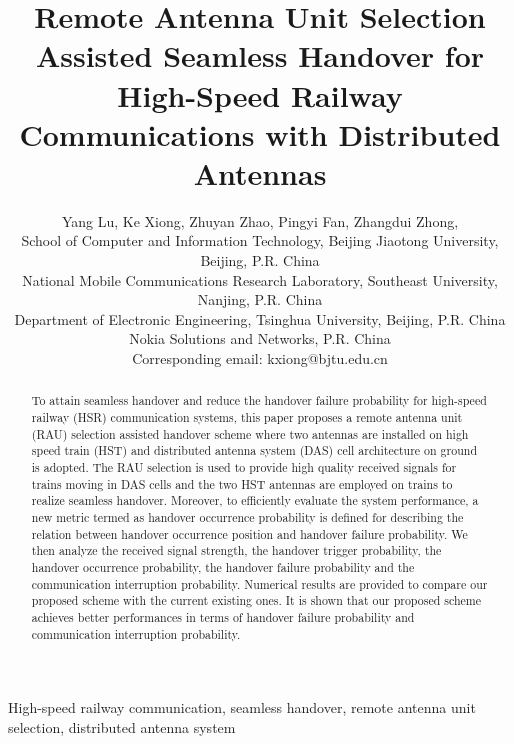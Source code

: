 \documentclass[a4paper,twocolumn,10pt]{IEEEtran}
\begin{document}
\title{Remote Antenna Unit Selection Assisted Seamless Handover for High-Speed Railway Communications with Distributed Antennas}

\author{Yang Lu, Ke Xiong, Zhuyan Zhao, Pingyi Fan, Zhangdui Zhong,
\\
\small
School of Computer and Information Technology, Beijing Jiaotong University, Beijing, P.R. China\\
National Mobile Communications
Research Laboratory, Southeast University, Nanjing, P.R. China\\
Department of Electronic Engineering, Tsinghua University, Beijing, P.R. China\\
Nokia Solutions and Networks, P.R. China\\
Corresponding email: kxiong@bjtu.edu.cn}


\maketitle

\begin{abstract}
To attain seamless handover and reduce the handover failure probability for high-speed railway (HSR) communication systems, this paper proposes a remote antenna unit (RAU) selection assisted handover scheme where two  antennas are installed on high speed train (HST) and distributed antenna system (DAS) cell architecture on ground is adopted. The RAU selection is used to provide high quality received signals for trains moving in DAS cells and the two HST antennas are employed on trains to realize seamless handover. Moreover, to efficiently evaluate the system performance, a new metric termed as handover occurrence probability is defined for describing  the relation between handover occurrence position and handover failure probability. We then analyze the received signal strength, the handover trigger probability, the handover occurrence probability, the handover failure probability and the communication interruption probability. Numerical results are provided to compare our proposed scheme with the current existing  ones. It is shown that our proposed scheme achieves better performances in terms of handover failure probability and communication interruption probability.
\end{abstract}

\begin{IEEEkeywords}
High-speed railway communication, seamless handover, remote antenna unit selection, distributed antenna system
\end{IEEEkeywords}
\end{document}
